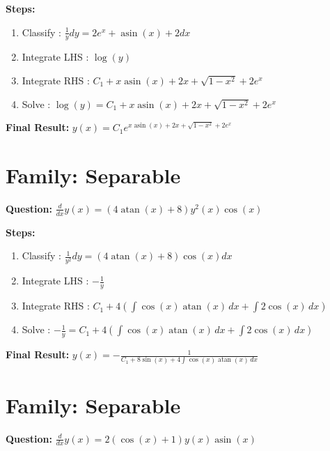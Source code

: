\documentclass{article}
\begin{document}
\textbf{Steps:}
\begin{enumerate}
\item Classify :  $\frac{1}{y} dy = 2 e^{x} + \operatorname{asin}{\left(x \right)} + 2 dx$
\item Integrate LHS :  $\log{\left(y \right)}$
\item Integrate RHS :  $C_{1} + x \operatorname{asin}{\left(x \right)} + 2 x + \sqrt{1 - x^{2}} + 2 e^{x}$
\item Solve :  $\log{\left(y \right)} = C_{1} + x \operatorname{asin}{\left(x \right)} + 2 x + \sqrt{1 - x^{2}} + 2 e^{x}$
\end{enumerate}
\textbf{Final Result:} $y{\left(x \right)} = C_{1} e^{x \operatorname{asin}{\left(x \right)} + 2 x + \sqrt{1 - x^{2}} + 2 e^{x}}$

\section*{Family: Separable}
\textbf{Question:} $\frac{d}{d x} y{\left(x \right)} = \left(4 \operatorname{atan}{\left(x \right)} + 8\right) y^{2}{\left(x \right)} \cos{\left(x \right)}$

\textbf{Steps:}
\begin{enumerate}
\item Classify :  $\frac{1}{y^{2}} dy = \left(4 \operatorname{atan}{\left(x \right)} + 8\right) \cos{\left(x \right)} dx$
\item Integrate LHS :  $- \frac{1}{y}$
\item Integrate RHS :  $C_{1} + 4 \left(\int \cos{\left(x \right)} \operatorname{atan}{\left(x \right)}\, dx + \int 2 \cos{\left(x \right)}\, dx\right)$
\item Solve :  $- \frac{1}{y} = C_{1} + 4 \left(\int \cos{\left(x \right)} \operatorname{atan}{\left(x \right)}\, dx + \int 2 \cos{\left(x \right)}\, dx\right)$
\end{enumerate}
\textbf{Final Result:} $y{\left(x \right)} = - \frac{1}{C_{1} + 8 \sin{\left(x \right)} + 4 \int \cos{\left(x \right)} \operatorname{atan}{\left(x \right)}\, dx}$

\section*{Family: Separable}
\textbf{Question:} $\frac{d}{d x} y{\left(x \right)} = 2 \left(\cos{\left(x \right)} + 1\right) y{\left(x \right)} \operatorname{asin}{\left(x \right)}$
\end{document}
